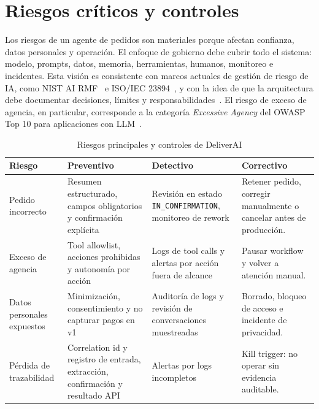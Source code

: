 \section{Riesgos críticos y controles}

Los riesgos de un agente de pedidos son materiales porque afectan confianza, datos personales y operación. El enfoque de gobierno debe cubrir todo el sistema: modelo, prompts, datos, memoria, herramientas, humanos, monitoreo e incidentes. Esta visión es consistente con marcos actuales de gestión de riesgo de IA, como NIST AI RMF~\cite{nist2023} e ISO/IEC 23894~\cite{iso23894}, y con la idea de que la arquitectura debe documentar decisiones, límites y responsabilidades~\cite{iso42010}. El riesgo de exceso de agencia, en particular, corresponde a la categoría \textit{Excessive Agency} del OWASP Top 10 para aplicaciones con LLM~\cite{owasp2025llm}.

\begin{table}[htbp]
\centering
\caption{Riesgos principales y controles de DeliverAI}%
\label{tab:riesgos}
\small
\begin{tabular}{@{}>{\raggedright\arraybackslash}p{3.2cm}>{\raggedright\arraybackslash}p{3.6cm}>{\raggedright\arraybackslash}p{3.6cm}>{\raggedright\arraybackslash}p{3.6cm}@{}}
\toprule
\textbf{Riesgo} & \textbf{Preventivo} & \textbf{Detectivo} & \textbf{Correctivo} \\ \midrule
Pedido incorrecto & Resumen estructurado, campos obligatorios y confirmación explícita & Revisión en estado \texttt{IN\_CONFIRMATION}, monitoreo de rework & Retener pedido, corregir manualmente o cancelar antes de producción. \\
Exceso de agencia & Tool allowlist, acciones prohibidas y autonomía por acción & Logs de tool calls y alertas por acción fuera de alcance & Pausar workflow y volver a atención manual. \\
Datos personales expuestos & Minimización, consentimiento y no capturar pagos en v1 & Auditoría de logs y revisión de conversaciones muestreadas & Borrado, bloqueo de acceso e incidente de privacidad. \\
Pérdida de trazabilidad & Correlation id y registro de entrada, extracción, confirmación y resultado API & Alertas por logs incompletos & Kill trigger: no operar sin evidencia auditable. \\ \bottomrule
\end{tabular}
\end{table}

